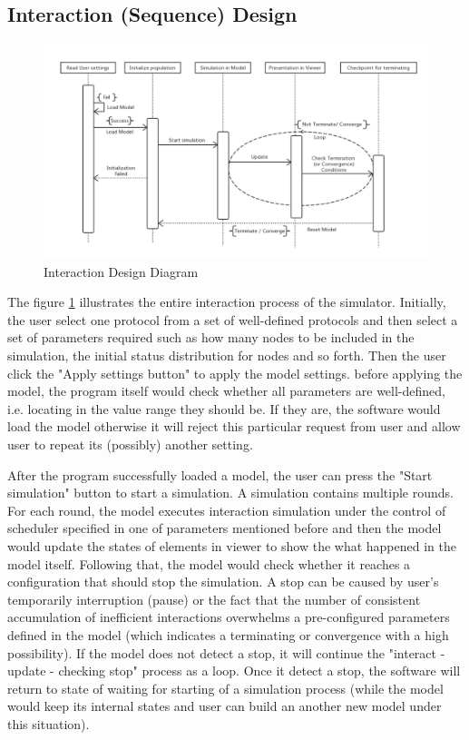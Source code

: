 \subsection{Interaction (Sequence) Design}
\begin{figure}[H]
\begin{center}
\includegraphics[width =\textwidth]{context/diagram/interaction.pdf}
\caption{Interaction Design Diagram}
\label{interactionG}
\end{center}
\end{figure}

\par\noindent
The figure \ref{interactionG} illustrates the entire interaction process of the
simulator. Initially, the user select one protocol from a set of well-defined
protocols and then select a set of parameters required such as how many nodes to
be included in the simulation, the initial status distribution for nodes and so forth.
Then the user click the "Apply settings button" to apply the model settings. before
applying the model, the program itself would check whether all parameters are
well-defined, i.e. locating in the value range they should be. If they are, the software
would load the model otherwise it will reject this particular request from user and
allow user to repeat its (possibly) another setting.

\par\noindent
After the program successfully loaded a model, the user can press the "Start simulation"
button to start a simulation. A simulation contains multiple rounds. For each round,
the model executes interaction simulation under the control of scheduler specified in one
of parameters mentioned before and then the model would update the states of elements
 in viewer to show the what happened in the model itself. Following that, the model would
 check whether it reaches a configuration that should stop the simulation. A stop can be caused
 by user's temporarily interruption (pause) or the fact that the number of consistent accumulation of
 inefficient interactions overwhelms a pre-configured parameters defined in the model (which indicates
 a terminating or convergence with a high possibility). If the model does not detect a stop,
 it will continue the "interact - update - checking stop" process as a loop. Once it detect a
 stop, the software will return to state of waiting for starting of a simulation process
 (while the model would keep its internal states and user can build an another new model under this situation).

